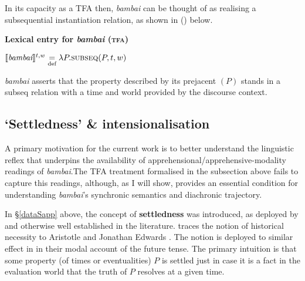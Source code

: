 \documentclass[11pt]{article}
\providecommand{\denote}[2][]{\ensuremath{\llbracket{#2}\rrbracket^{#1}}}
\begin{document}
	In its capacity as a TFA then, \textit{bambai} can be thought of as realising a subsequential instantiation relation, as shown in (\nextx) below.
	
\pex \textbf{Lexical entry for \textit{bambai} (\textsc{tfa})}

	$\denote[t,w]{\textit{bambai}}\underset{\text{def}}{=}\lambda P.\text{{\sc subseq}}(P,t,w)$

\textit{bambai} asserts that the property described by its prejacent $ (P) $ stands in a {\sc subseq} relation with a time and world provided by the discourse context.
\xe
	
	
	\subsection{`Settledness' \& intensionalisation}\label{modSems}
	
A primary motivation for the current work is to better understand the linguistic reflex that underpins the availability of apprehensional/apprehensive-modality readings of \textit{bambai}.The TFA treatment formalised in the subsection above fails to capture this readings, although, as I will show, provides an essential condition for understanding \textit{bambai}'s synchronic semantics and diachronic trajectory.

In §\ref{dataSapp} above, the concept of \textbf{settledness} was introduced, as deployed by \citet{Condoravdi2002} and otherwise well established in the literature. \citeauthor{Thomason1984} traces the notion of historical necessity to Aristotle and Jonathan Edwards \citeyearpar[138]{Thomason1984} \citep[see also][]{Kamp1979}. The notion is deployed to similar effect in \citet{Giannakidou2018} in their modal account of the future tense. The primary intuition is that some property (of times or eventualities) $P$ is settled just in case it is a fact in the evaluation world that the truth of $P$ resolves at a given time.
\end{document}
